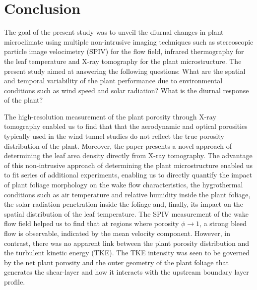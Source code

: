 \section{Conclusion}

The goal of the present study was to unveil the diurnal changes in plant microclimate using multiple non-intrusive imaging techniques such as stereoscopic particle image velocimetry (SPIV) for the flow field, infrared thermography for the leaf temperature and X-ray tomography for the plant microstructure. The present study aimed at answering the following questions: What are the spatial and temporal variability of the plant performance due to environmental conditions such as wind speed and solar radiation? What is the diurnal response of the plant? 

The high-resolution measurement of the plant porosity through X-ray tomography enabled us to find that that the aerodynamic and optical porosities typically used in the wind tunnel studies do not reflect the true porosity distribution of the plant. Moreover, the paper presents a novel approach of determining the leaf area density directly from X-ray tomography. The advantage of this non-intrusive approach of determining the plant microstructure enabled us to fit series of additional experiments, enabling us to directly quantify the impact of plant foliage morphology on the wake flow characteristics, the hygrothermal conditions such as air temperature and relative humidity inside the plant foliage, the solar radiation penetration inside the foliage and, finally, its impact on the spatial distribution of the leaf temperature. The SPIV measurement of the wake flow field helped us to find that at regions where porosity $\phi\rightarrow 1$, a strong bleed flow is observable, indicated by the mean velocity component. However, in contrast, there was no apparent link between the plant porosity distribution and the turbulent kinetic energy (TKE). The TKE intensity was seen to be governed by the net plant porosity and the outer geometry of the plant foliage that generates the shear-layer and how it interacts with the upstream boundary layer profile.

